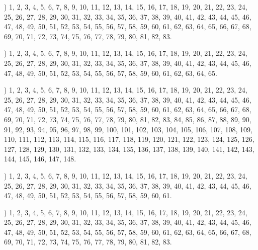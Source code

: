 \documentclass[a4paper,11pt]{article}
\begin{document}
\noindent
{}) 1, 2, 3, 4, 5, 6, 7, 8, 9, 10, 11, 12, 13, 14, 15,
16, 17, 18, 19, 20, 21, 22, 23, 24, 25, 26, 27, 28, 29, 30, 31, 32,
33, 34, 35, 36, 37, 38, 39, 40, 41, 42, 43, 44, 45, 46, 47, 48, 49,
50, 51, 52, 53, 54, 55, 56, 57, 58, 59, 60, 61, 62, 63, 64, 65, 66,
67, 68, 69, 70, 71, 72, 73, 74, 75, 76, 77, 78, 79, 80, 81, 82, 83.

\vspace{\spaceFour}



\noindent
{}) 1, 2, 3, 4, 5, 6, 7, 8, 9, 10, 11, 12, 13, 14, 15,
16, 17, 18, 19, 20, 21, 22, 23, 24, 25, 26, 27, 28, 29, 30, 31, 32,
33, 34, 35, 36, 37, 38, 39, 40, 41, 42, 43, 44, 45, 46, 47, 48, 49,
50, 51, 52, 53, 54, 55, 56, 57, 58, 59, 60, 61, 62, 63, 64, 65.

\vspace{\spaceFour}



\noindent
{}) 1, 2, 3, 4, 5, 6, 7, 8, 9, 10, 11, 12, 13, 14, 15,
16, 17, 18, 19, 20, 21, 22, 23, 24, 25, 26, 27, 28, 29, 30, 31, 32,
33, 34, 35, 36, 37, 38, 39, 40, 41, 42, 43, 44, 45, 46, 47, 48, 49,
50, 51, 52, 53, 54, 55, 56, 57, 58, 59, 60, 61, 62, 63, 64, 65, 66,
67, 68, 69, 70, 71, 72, 73, 74, 75, 76, 77, 78, 79, 80, 81, 82, 83,
84, 85, 86, 87, 88, 89, 90, 91, 92, 93, 94, 95, 96, 97, 98, 99, 100,
101, 102, 103, 104, 105, 106, 107, 108, 109, 110, 111, 112, 113, 114,
115, 116, 117, 118, 119, 120, 121, 122, 123, 124, 125, 126, 127, 128,
129, 130, 131, 132, 133, 134, 135, 136, 137, 138, 139, 140, 141, 142,
143, 144, 145, 146, 147, 148.

\vspace{\spaceFour}



\noindent
{}) 1, 2, 3, 4, 5, 6, 7, 8, 9, 10, 11, 12, 13, 14, 15, 16,
17, 18, 19, 20, 21, 22, 23, 24, 25, 26, 27, 28, 29, 30, 31, 32, 33, 34,
35, 36, 37, 38, 39, 40, 41, 42, 43, 44, 45, 46, 47, 48, 49, 50, 51, 52,
53, 54, 55, 56, 57, 58, 59, 60, 61.

\vspace{\spaceFour}



\noindent
{}) 1, 2, 3, 4, 5, 6, 7, 8, 9, 10, 11, 12, 13, 14, 15,
16, 17, 18, 19, 20, 21, 22, 23, 24, 25, 26, 27, 28, 29, 30, 31, 32,
33, 34, 35, 36, 37, 38, 39, 40, 41, 42, 43, 44, 45, 46, 47, 48, 49,
50, 51, 52, 53, 54, 55, 56, 57, 58, 59, 60, 61, 62, 63, 64, 65, 66,
67, 68, 69, 70, 71, 72, 73, 74, 75, 76, 77, 78, 79, 80, 81, 82, 83.
\end{document}
